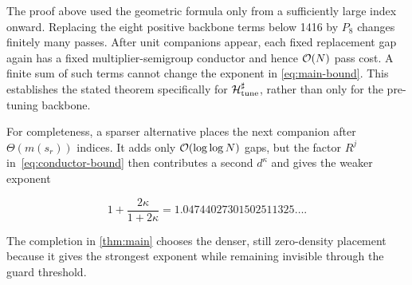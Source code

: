 The proof above used the geometric formula only from a sufficiently large
index onward.  Replacing the eight positive backbone terms below 1416 by
$P_8$ changes finitely many passes.  After unit companions appear, each fixed
replacement gap again has a fixed multiplier-semigroup conductor and hence
$\mathcal{O}(N)$ pass cost.  A finite sum of such terms cannot change the exponent in
\eqref{eq:main-bound}.  This establishes the stated theorem specifically for
$\mathcal H^\sharp_{\rm tune}$, rather than only for the pre-tuning backbone.

For completeness, a sparser alternative places the next companion after
$\Theta(m(s_r))$ indices.  It adds only $\mathcal{O}(\log\log N)$ gaps, but the factor
$R^j$ in~\eqref{eq:conductor-bound} then contributes a second $d^\kappa$ and
gives the weaker exponent

\[
  1+\frac{2\kappa}{1+2\kappa}
  =1.04744027301502511325\ldots.
\]

The completion in \cref{thm:main} chooses the denser, still zero-density
placement because it gives the strongest exponent while remaining invisible
through the guard threshold.
